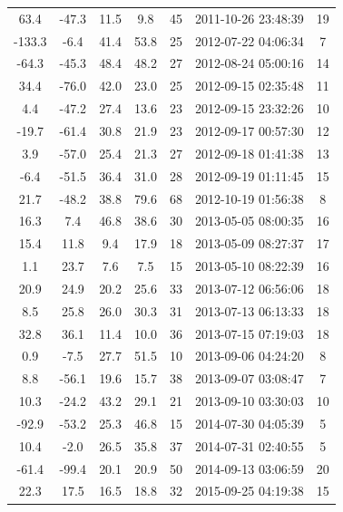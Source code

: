 \documentclass[12pt,a4paper]{report}
\begin{document}
\begin{longtable}{|c|c|c|c|c|c|c|}
63.4 & -47.3 & 11.5 & 9.8 &  45 & 2011-10-26 23:48:39 &  19 \\
-133.3 & -6.4 & 41.4 & 53.8 &  25 & 2012-07-22 04:06:34 &   7 \\
-64.3 & -45.3 & 48.4 & 48.2 &  27 & 2012-08-24 05:00:16 &  14 \\
34.4 & -76.0 & 42.0 & 23.0 &  25 & 2012-09-15 02:35:48 &  11 \\
4.4 & -47.2 & 27.4 & 13.6 &  23 & 2012-09-15 23:32:26 &  10 \\
-19.7 & -61.4 & 30.8 & 21.9 &  23 & 2012-09-17 00:57:30 &  12 \\
3.9 & -57.0 & 25.4 & 21.3 &  27 & 2012-09-18 01:41:38 &  13 \\
-6.4 & -51.5 & 36.4 & 31.0 &  28 & 2012-09-19 01:11:45 &  15 \\
21.7 & -48.2 & 38.8 & 79.6 &  68 & 2012-10-19 01:56:38 &   8 \\
16.3 & 7.4 & 46.8 & 38.6 &  30 & 2013-05-05 08:00:35 &  16 \\
15.4 & 11.8 & 9.4 & 17.9 &  18 & 2013-05-09 08:27:37 &  17 \\
1.1 & 23.7 & 7.6 & 7.5 &  15 & 2013-05-10 08:22:39 &  16 \\
20.9 & 24.9 & 20.2 & 25.6 &  33 & 2013-07-12 06:56:06 &  18 \\
8.5 & 25.8 & 26.0 & 30.3 &  31 & 2013-07-13 06:13:33 &  18 \\
32.8 & 36.1 & 11.4 & 10.0 &  36 & 2013-07-15 07:19:03 &  18 \\
0.9 & -7.5 & 27.7 & 51.5 &  10 & 2013-09-06 04:24:20 &   8 \\
8.8 & -56.1 & 19.6 & 15.7 &  38 & 2013-09-07 03:08:47 &   7 \\
10.3 & -24.2 & 43.2 & 29.1 &  21 & 2013-09-10 03:30:03 &  10 \\
-92.9 & -53.2 & 25.3 & 46.8 &  15 & 2014-07-30 04:05:39 &   5 \\
10.4 & -2.0 & 26.5 & 35.8 &  37 & 2014-07-31 02:40:55 &   5 \\
-61.4 & -99.4 & 20.1 & 20.9 &  50 & 2014-09-13 03:06:59 &  20 \\
22.3 & 17.5 & 16.5 & 18.8 &  32 & 2015-09-25 04:19:38 &  15 \\
\hline
\end{longtable}
 
 
\end{document}
